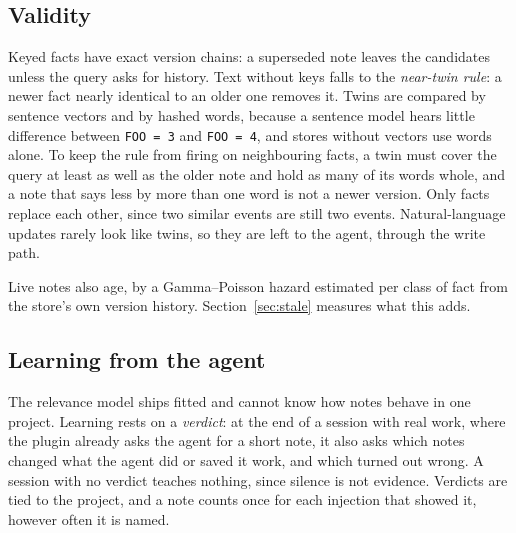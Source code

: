 \subsection{Validity}
Keyed facts have exact version chains: a superseded note leaves the candidates unless the query asks for history. Text without keys falls to the \emph{near-twin rule}: a newer fact nearly identical to an older one removes it. Twins are compared by sentence vectors and by hashed words, because a sentence model hears little difference between \texttt{FOO = 3} and \texttt{FOO = 4}, and stores without vectors use words alone. To keep the rule from firing on neighbouring facts, a twin must cover the query at least as well as the older note and hold as many of its words whole, and a note that says less by more than one word is not a newer version. Only facts replace each other, since two similar events are still two events. Natural-language updates rarely look like twins, so they are left to the agent, through the write path.

Live notes also age, by a Gamma--Poisson hazard estimated per class of fact from the store's own version history. Section~\ref{sec:stale} measures what this adds.

\subsection{Learning from the agent}\label{sec:learning}
The relevance model ships fitted and cannot know how notes behave in one project. Learning rests on a \emph{verdict}: at the end of a session with real work, where the plugin already asks the agent for a short note, it also asks which notes changed what the agent did or saved it work, and which turned out wrong. A session with no verdict teaches nothing, since silence is not evidence. Verdicts are tied to the project, and a note counts once for each injection that showed it, however often it is named.

